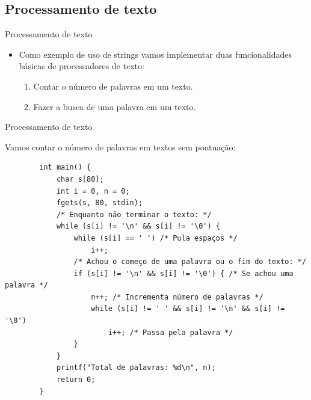 \documentclass[handout]{beamer}
\begin{document}

\subsection{Processamento de texto}

\begin{frame}[fragile]{Processamento de texto}

    \begin{itemize}
        \item Como exemplo de uso de strings vamos implementar duas funcionalidades básicas de processadores de texto:
        \begin{enumerate}
            \item Contar o número de palavras em um texto.
            \item Fazer a busca de uma palavra em um texto.
        \end{enumerate}
    \end{itemize}

\end{frame}

\begin{frame}[fragile]{Processamento de texto}

    Vamos contar o número de palavras em textos sem pontuação:

    \begin{verbatim}
        int main() {
            char s[80];
            int i = 0, n = 0;
            fgets(s, 80, stdin);
            /* Enquanto não terminar o texto: */
            while (s[i] != '\n' && s[i] != '\0') {
                while (s[i] == ' ') /* Pula espaços */
                    i++;
                /* Achou o começo de uma palavra ou o fim do texto: */
                if (s[i] != '\n' && s[i] != '\0') { /* Se achou uma palavra */
                    n++; /* Incrementa número de palavras */
                    while (s[i] != ' ' && s[i] != '\n' && s[i] != '\0')
                        i++; /* Passa pela palavra */
                }
            }
            printf("Total de palavras: %d\n", n);
            return 0;
        }
    \end{verbatim}

\end{frame}
\end{document}
